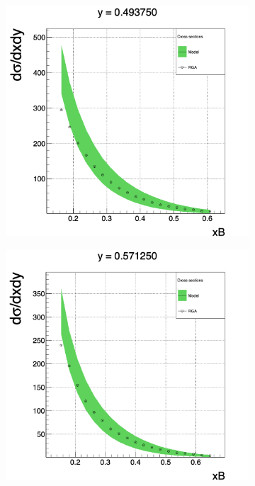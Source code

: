 \begin{figure}[h!]
	\centering
	\begin{subfigure}[b]{0.44\linewidth}
		\includegraphics[width=\linewidth]{figures/rga/xsec_2.png}
		\label{fig:rga_xsec2}
	\end{subfigure}
	\begin{subfigure}[b]{0.44\textwidth}
		\includegraphics[width=\linewidth]{figures/rga/xsec_3.png}
		\label{fig:rga_xsec3}
	\end{subfigure}
\end{figure}
